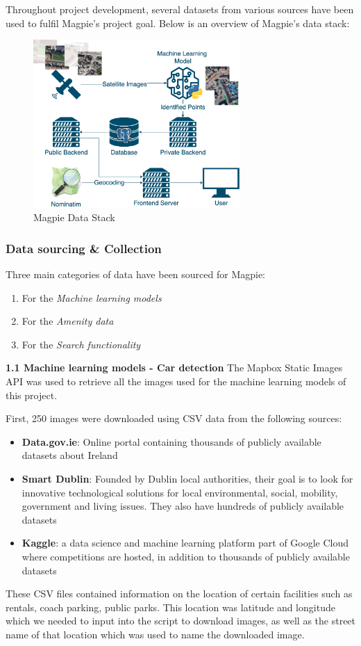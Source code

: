 Throughout project development, several datasets from various sources have been
used to fulfil Magpie's project goal. Below is an overview of Magpie's data
stack:
\begin{figure}[htbp]
    \centering
    \includegraphics[width=0.7\textwidth]{images/magpie-data-stack.png}
    \caption{Magpie Data Stack}
\end{figure}

\subsubsection{Data sourcing \& Collection}
Three main categories of data have been sourced for Magpie:
\begin{enumerate}
    \item For the \emph{Machine learning models}
    \item For the \emph{Amenity data}
    \item For the \emph{Search functionality}
\end{enumerate}

\textbf{1.1 Machine learning models - Car detection}
The Mapbox Static Images API was used to retrieve all the images used for the
machine learning models of this project.

First, 250 images were downloaded using CSV data from the following sources:
\begin{itemize}
    \item \textbf{Data.gov.ie}: Online portal containing thousands of publicly
    available datasets about Ireland
    \item \textbf{Smart Dublin}: Founded by Dublin local authorities, their goal
    is to look for innovative technological solutions for local environmental,
    social, mobility, government and living issues. They also have hundreds of
    publicly available datasets
    \item \textbf{Kaggle}: a data science and machine learning platform part of
    Google Cloud where competitions are hosted, in addition to thousands of
    publicly available datasets
\end{itemize}
These CSV files contained information on the location of certain facilities such
as rentals, coach parking, public parks. This location was latitude and
longitude which we needed to input into the script to download images, as well
as the street name of that location which was used to name the downloaded image.

